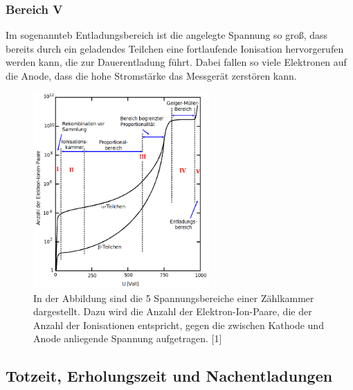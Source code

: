 \documentclass[titlepage = firstcover]{scrartcl}
\begin{document}
            \subsubsection*{Bereich V}
                Im sogenannteb Entladungsbereich ist die angelegte Spannung so groß, dass bereits durch ein geladendes Teilchen eine fortlaufende Ionisation hervorgerufen werden kann, die zur 
                Dauerentladung führt. Dabei fallen so viele Elektronen auf die Anode, dass die hohe Stromstärke das Messgerät zerstören kann.

                \FloatBarrier

                \begin{figure}[h]
                  \centering
                  \includegraphics[width = 0.6\textwidth]{Bilder/Bereiche.png}
                  \caption{In der Abbildung sind die 5 Spannungsbereiche einer Zählkammer dargestellt. Dazu wird die Anzahl der Elektron-Ion-Paare, die der Anzahl der Ionisationen entspricht, gegen die zwischen Kathode und Anode anliegende Spannung aufgetragen. [1]}
                  \label{fig:Bereiche}
                \end{figure}
    
                \FloatBarrier
                
                \noindent
        \subsection{Totzeit, Erholungszeit und Nachentladungen}
\end{document}
